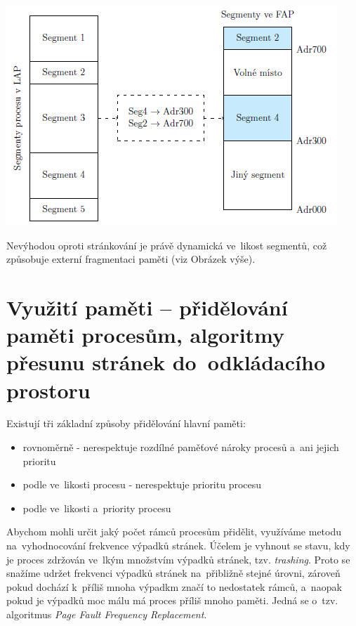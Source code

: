 \begin{center}
    \includegraphics[scale=1]{images/mem_segment_table.png} \label{mem:segment-table}
\end{center}

Nevýhodou oproti stránkování je právě dynamická ve~likost segmentů, což způsobuje externí fragmentaci paměti (viz Obrázek výše).


\clearpage
\section{Využití paměti -- přidělování paměti procesům, algoritmy přesunu stránek do~odkládacího prostoru}

Existují tři základní způsoby přidělování hlavní paměti:
\begin{itemize}
    \item rovnoměrně - nerespektuje rozdílné paměťové nároky procesů a~ani jejich prioritu
    \item podle ve~likosti procesu - nerespektuje prioritu procesu
    \item podle ve~likosti a~priority procesu
\end{itemize}

Abychom mohli určit jaký počet rámců procesům přidělit, využíváme metodu na~vyhodnocování frekvence výpadků stránek. Účelem je vyhnout se stavu, kdy je proces zdržován ve~lkým množstvím výpadků stránek, tzv. \emph{trashing}. Proto se snažíme udržet frekvenci výpadků stránek na~přibližně stejné úrovni, zároveň pokud dochází k~příliš mnoha výpadkm značí to nedostatek rámců, a~naopak pokud je výpadků moc málu má proces příliš mnoho paměti. Jedná se o~tzv. algoritmus \emph{Page Fault Frequency Replacement}. 

